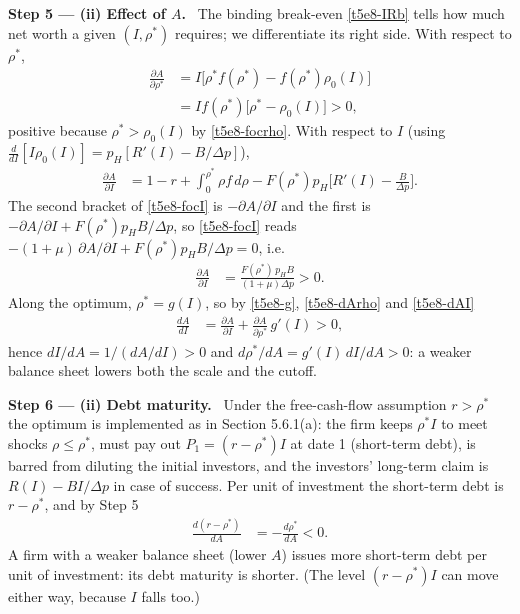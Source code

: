 \documentclass[11pt,a4paper]{article}
\newcommand{\step}[2]{\par\medskip\noindent\textbf{Step #1 --- #2.}~}
\begin{document}
\step{5}{(ii) Effect of $A$} The binding break-even \eqref{t5e8-IRb} tells how much net worth a given
$(I,\rho^*)$ requires; we differentiate its right side. With respect to $\rho^*$,
\begin{align}
  \frac{\partial A}{\partial\rho^*} &= I\big[\rho^*f(\rho^*)-f(\rho^*)\rho_0(I)\big] \nonumber\\
  &= I f(\rho^*)\big[\rho^*-\rho_0(I)\big] > 0, \label{t5e8-dArho}
\end{align}
positive because $\rho^*>\rho_0(I)$ by \eqref{t5e8-focrho}. With respect to $I$ (using $\frac{d}{dI}[I\rho_0(I)]=p_H[R'(I)-B/\Delta p]$),
\begin{align}
  \frac{\partial A}{\partial I} &= 1-r+\int_0^{\rho^*}\!\rho f\,d\rho - F(\rho^*)p_H\Big[R'(I)-\frac{B}{\Delta p}\Big]. \nonumber
\end{align}
The second bracket of \eqref{t5e8-focI} is $-\partial A/\partial I$ and the first is $-\partial A/\partial I+F(\rho^*)p_HB/\Delta p$,
so \eqref{t5e8-focI} reads $-(1+\mu)\,\partial A/\partial I + F(\rho^*)p_HB/\Delta p=0$, i.e.
\begin{align}
  \frac{\partial A}{\partial I} &= \frac{F(\rho^*)\,p_HB}{(1+\mu)\Delta p} > 0. \label{t5e8-dAI}
\end{align}
Along the optimum, $\rho^*=g(I)$, so by \eqref{t5e8-g}, \eqref{t5e8-dArho} and \eqref{t5e8-dAI}
\begin{align}
  \frac{dA}{dI} &= \frac{\partial A}{\partial I}+\frac{\partial A}{\partial\rho^*}\,g'(I) > 0, \label{t5e8-dAdI}
\end{align}
hence $dI/dA=1/(dA/dI)>0$ and $d\rho^*/dA=g'(I)\,dI/dA>0$: a weaker balance sheet lowers both the scale
and the cutoff.

\step{6}{(ii) Debt maturity} Under the free-cash-flow assumption $r>\rho^*$ the optimum is implemented as in
Section 5.6.1(a): the firm keeps $\rho^*I$ to meet shocks $\rho\le\rho^*$, must pay out
$P_1=(r-\rho^*)I$ at date 1 (short-term debt), is barred from diluting the initial investors, and the investors' long-term
claim is $R(I)-BI/\Delta p$ in case of success. Per unit of investment the short-term debt is $r-\rho^*$, and by Step 5
\begin{align}
  \frac{d(r-\rho^*)}{dA} &= -\frac{d\rho^*}{dA} < 0. \label{t5e8-mat}
\end{align}
A firm with a weaker balance sheet (lower $A$) issues more short-term debt per unit of investment: its debt
maturity is shorter. (The level $(r-\rho^*)I$ can move either way, because $I$ falls too.)
\end{document}
